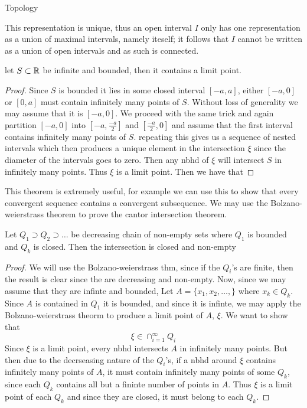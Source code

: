 \begin{chapter}{Topology}
    \begin{rem}
        This representation is unique, thus an open interval $I$ only has one representation as a union of maximal intervals, namely iteself; it follows 
        that $I$ cannot be written as a union of open intervals and as such is connected. 
    \end{rem}

    
    
    \begin{thm}
        let $S \subset \mathbb{R}$ be infinite and bounded, then it contains a limit point. 
    \end{thm}

    \begin{proof}
        Since $S$ is bounded it lies in some closed interval $[-a, a]$, either $[-a, 0]$ or $[0, a]$ must contain infinitely many points of $S$. 
        Without loss of generality we may assume that it is $[-a, 0]$. We proceed with the same trick and again partition $[-a, 0]$ into 
        $[-a, \frac{-a}{2}]$ and $[\frac{-a}{2}, 0]$ and assume that the first interval contains infinitely many points of $S$. 
        repeating this gives us a sequence of nested intervals which then produces a unique element in the intersection $\xi$ since the diameter of 
        the intervals goes to zero. Then any nbhd of $\xi$ will intersect $S$ in infinitely many points. Thus $\xi$ is a limit point. 
        Then we have that 
    \end{proof}

    This theorem is extremely useful, for example we can use this to show that every convergent sequence contains a convergent subsequence. 
    We may use the Bolzano-weierstrass theorem to prove the cantor intersection theorem. 

    
    \begin{thm}
        Let $Q_1 \supset Q_2 \supset \dots$ be decreasing chain of non-empty sets where $Q_1$ is bounded and $Q_k$ is closed. 
        Then the intersection is closed and non-empty
    \end{thm}

    \begin{proof}
        We will use the Bolzano-weierstrass thm, since if the $Q_i$'s are finite, then the result is clear since the are decreasing and non-empty. 
        Now, since we may assume that they are infinte and bounded, Let $A = \{x_1, x_2, \dots, \}$ where $x_k \in Q_k$. Since $A$ is contained in $Q_1$ 
        it is bounded, and since it is infinte, we may apply the Bolzano-weierstrass theorm to produce a limit point of $A$, $\xi$. We want to show that 
        \[\xi \in \cap_{i =1}^\infty Q_i\]
        Since $\xi$ is a limit point, every nbhd intersects $A$ in infinitely many points. But then due to the decrseasing nature of the $Q_i$'s, 
        if a nbhd around $\xi$ contains infinitely many points of $A$, it must contain infinitely many points of some $Q_k$, since each $Q_k$ contains all but a fininte number of points in $A$. Thus $\xi$ is a limit point 
        of each $Q_k$ and since they are closed, it must belong to each $Q_k$. 
    \end{proof}


\end{chapter}

